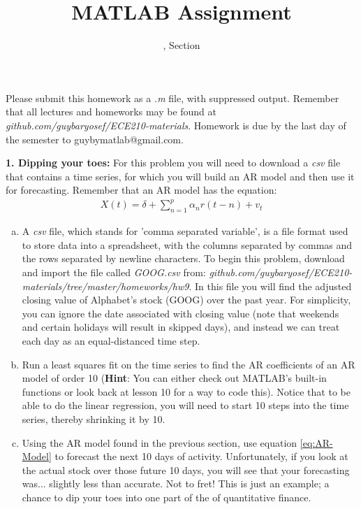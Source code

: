 \documentclass[11pt]{article}
\title{MATLAB Assignment \Homework}
\author{\Session, Section \Section}
\date{}
\makeatletter
\def\MyEmail{guybymatlab@gmail.com}
\makeatother
\begin{document}
\maketitle
Please submit this homework as a \textit{.m} file, 
with suppressed output.
Remember that all lectures and homeworks may be found at 
\textit{github.com/guybaryosef/ECE210-materials}.
Homework is due by the last day of the semester to \MyEmail.

\noindent
\newline
\textbf{1. Dipping your toes:}
For this problem you will need to download a \textit{csv} file that
contains a time series, for which you will build an AR model and then
use it for forecasting. Remember that an AR model has the equation:
\begin{eqnarray}\label{eq:AR-Model}
    X(t) = \delta + \sum_{n = 1}^{p}\alpha_nr(t-n) + v_t
\end{eqnarray}

\begin{enumerate}[a.]
    \item A \textit{csv} file, which stands for 'comma separated variable',
    is a file format used to store data into a spreadsheet, 
    with the columns separated by commas and the rows separated by 
    newline characters.
    To begin this problem, download and import the file called \textit{GOOG.csv}
    from:
    \textit{github.com/guybaryosef/ECE210-materials/tree/master/homeworks/hw9}.
    In this file you will find the adjusted closing value of Alphabet's stock
    (GOOG) over the past year.
    For simplicity, you can ignore the date associated with closing value
    (note that weekends and certain holidays will result in skipped days),
    and instead we can treat each day as an equal-distanced time step.

    \item Run a least squares fit on the time series to find the AR
    coefficients of an AR model of order 10 (\textbf{Hint}: You can either check
    out MATLAB's built-in functions or look back at lesson 10 for a way to code
    this).
    Notice that to be able to do the linear regression, you will need to
    start 10 steps into the time series,
    thereby shrinking it by 10. 

    \item Using the AR model found in the previous section, use equation
    \eqref{eq:AR-Model} to forecast the next 10 days of activity.
    Unfortunately, if you look at the actual stock over those future 10 days,
    you will see that your forecasting was... slightly less than accurate. 
    Not to fret!
    This is just an example; a chance to dip your toes into one part of the
    of quantitative finance.
\end{enumerate}
\end{document}
